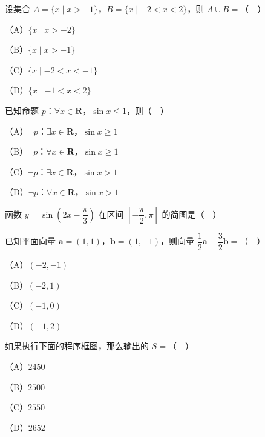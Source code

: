 


\begin{question}
设集合 $A=\{x\mid x>-1\}$，$B=\{x\mid -2<x<2\}$，则 $A\cup B=$（　）

（A）$\{x\mid x>-2\}$

（B）$\{x\mid x>-1\}$

（C）$\{x\mid -2<x<-1\}$

（D）$\{x\mid -1<x<2\}$

\end{question}
\begin{question}
已知命题 $p$：$\forall x\in\mathbf R$，$\sin x\leqslant1$，则（　）

（A）$\neg p$：$\exists x\in\mathbf R$，$\sin x\geqslant1$

（B）$\neg p$：$\forall x\in\mathbf R$，$\sin x\geqslant1$

（C）$\neg p$：$\exists x\in\mathbf R$，$\sin x>1$

（D）$\neg p$：$\forall x\in\mathbf R$，$\sin x>1$

\Needspace{0.4\textheight}
\end{question}
\begin{question}
函数 $y=\sin\left(2x-\dfrac{\pi}{3}\right)$ 在区间 $\left[-\dfrac{\pi}{2},\pi\right]$ 的简图是（　）
\nopagebreak[4]
\begin{center}\end{center}
\nopagebreak[4]
\end{question}
\begin{question}
已知平面向量 $\boldsymbol a=(1,1)$，$\boldsymbol b=(1,-1)$，则向量 $\dfrac12\boldsymbol a-\dfrac32\boldsymbol b=$（　）

（A）$(-2,-1)$

（B）$(-2,1)$

（C）$(-1,0)$

（D）$(-1,2)$

\Needspace{0.4\textheight}
\end{question}
\begin{question}
如果执行下面的程序框图，那么输出的 $S=$（　）
\nopagebreak[4]
\begin{center}\end{center}
\nopagebreak[4]
（A）$2450$

（B）$2500$

（C）$2550$

（D）$2652$

\end{question}
